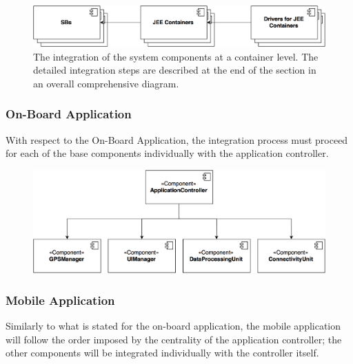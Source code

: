 \begin{figure}[H]
\begin{center}
		\includegraphics[width=\textwidth]{./integration_strategy/diagrams/containers.png}
		\caption{The integration of the system components at a container level. The detailed integration steps are described at the end of the section in an overall comprehensive diagram.}
\end{center}
\end{figure}

\subsubsection{On-Board Application}
With respect to the On-Board Application, the integration process must proceed for each of the base components individually with the application controller.

\begin{figure}[H]
\begin{center}
		\includegraphics[width=\textwidth]{./integration_strategy/diagrams/on_board.png}
\end{center}
\end{figure}

\subsubsection{Mobile Application}
Similarly to what is stated for the on-board application, the mobile application will follow the order imposed by the centrality of the application controller; the other components will be integrated individually with the controller itself.

